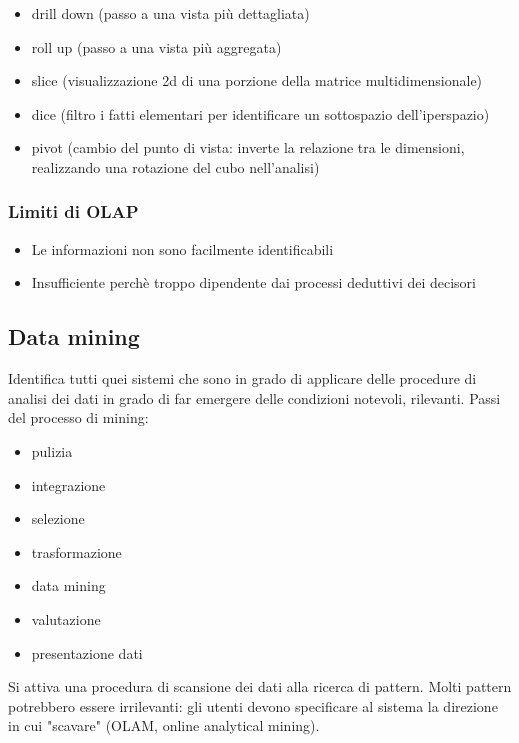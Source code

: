 \begin{itemize}

\item
  drill down (passo a una vista pi\`u dettagliata)
\item
  roll up (passo a una vista pi\`u aggregata)
\item
  slice (visualizzazione 2d di una porzione della matrice
  multidimensionale)
\item
  dice (filtro i fatti elementari per identificare un sottospazio
  dell'iperspazio)
\item
  pivot (cambio del punto di vista: inverte la relazione tra le dimensioni, realizzando una rotazione del cubo nell'analisi)
\end{itemize}

\subsubsection{Limiti di OLAP}\label{limiti-di-olap}

\begin{itemize}

\item
  Le informazioni non sono facilmente identificabili
\item
  Insufficiente perch\`e troppo dipendente dai processi deduttivi dei decisori
\end{itemize}

\subsection{Data mining}\label{data-mining}

Identifica tutti quei sistemi che sono in grado di applicare delle
procedure di analisi dei dati in grado di far emergere delle condizioni notevoli, rilevanti. Passi del processo di mining:

\begin{itemize}

\item
  pulizia
\item
  integrazione
\item
  selezione
\item
  trasformazione
\item
  data mining
\item
  valutazione
\item
  presentazione dati
\end{itemize}

Si attiva una procedura di scansione dei dati alla ricerca di pattern.
Molti pattern potrebbero essere irrilevanti: gli utenti devono
specificare al sistema la direzione in cui "scavare"  (OLAM, online analytical mining).

